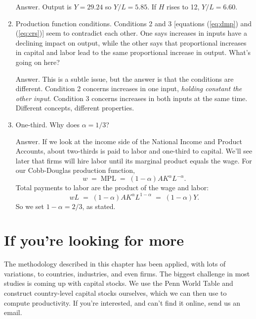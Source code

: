 \begin{enumerate}
Answer.  Output is $Y = 29.24$ so $Y/L = 5.85$.  If $H$ rises to 12,
$Y/L = 6.60 $.

\item Production function conditions.
Conditions 2 and 3 [equations (\ref{eq:dmp}) and (\ref{eq:crs})]
seem to contradict each other.
One says increases in inputs have a declining impact on output, while
the other says that proportional increases in capital and labor
lead to the same proportional increase in output.  What's going on here?

Answer.  This is a subtle issue, but the answer is that
the conditions are different.
Condition 2 concerns increases in one input,
{\it holding constant the other input\/}.
Condition 3 concerns increases in both inputs at the same time.
Different concepts, different properties.

\item One-third.  Why does $\alpha=1/3$?

Answer.  If we look at the income side of the National Income
and Product Accounts, about two-thirds is paid to labor
and one-third to capital.
We'll see later that firms will hire labor until its
marginal product   equals the wage.
For our Cobb-Douglas   production function,
\[
    w \;=\; \mbox{MPL} \;=\; (1-\alpha) A K^\alpha L^{-\alpha} .
\]
Total payments to labor are the product of the wage and labor:
\[
    w L  \;=\; (1-\alpha) A K^\alpha L^{1-\alpha} \;=\; (1-\alpha) Y.
\]
So we set $1-\alpha = 2/3$, as stated.
\end{enumerate}


\section*{If you're looking for more}

The methodology described in this chapter has been applied,
with lots of variations,
to countries, industries, and even firms.
The biggest challenge in most studies is coming up with capital stocks.
We use the Penn World Table and construct country-level capital stocks ourselves,
which we can then use to compute productivity.
If you're interested, and can't find it online, send us an email.

